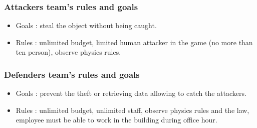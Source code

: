 \documentclass[11pt]{article} %
\begin{document}
\subsubsection{Attackers team's rules and goals}
\begin{itemize}
\item Goals : steal the object without being caught.
\item Rules : unlimited budget, limited human attacker in the game (no more than ten person), observe physics rules.
\end{itemize}

\subsubsection{Defenders team's rules and goals}
\begin{itemize}
\item Goals : prevent the theft or retrieving data allowing to catch the attackers.
\item Rules : unlimited budget, unlimited staff, observe physics rules and the law, employee must be able to work in the building during office hour.
\end{itemize}


\end{document}
